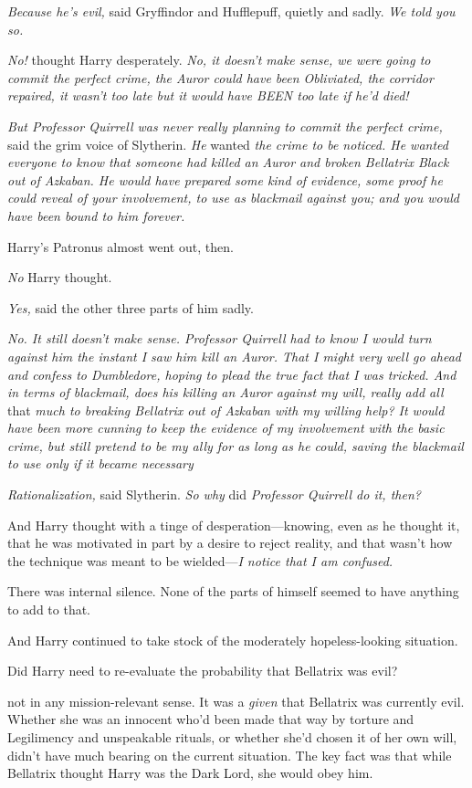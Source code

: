 \emph{Because he's evil,} said Gryffindor and Hufflepuff, quietly and sadly.
\emph{We told you so.}

\emph{No!} thought Harry desperately. \emph{No, it doesn't make sense, we were
going to commit the perfect crime, the Auror could have been Obliviated, the
corridor repaired, it wasn't too late but it would have BEEN too late if he'd
died!}

\emph{But Professor Quirrell was never really planning to commit the perfect
crime,} said the grim voice of Slytherin. \emph{He} wanted \emph{the crime to
be noticed. He wanted everyone to know that someone had killed an Auror and
broken Bellatrix Black out of Azkaban. He would have prepared some kind of
evidence, some proof he could reveal of your involvement, to use as blackmail
against you; and you would have been bound to him forever.}

Harry's Patronus almost went out, then.

\emph{No{\el}} Harry thought.

\emph{Yes,} said the other three parts of him sadly.

\emph{No. It still doesn't make sense. Professor Quirrell had to know I would
turn against him the instant I saw him kill an Auror. That I might very well go
ahead and confess to Dumbledore, hoping to plead the true fact that I was
tricked. And{\el} in terms of blackmail, does his killing an Auror against
my will, really add all} that \emph{much to breaking Bellatrix out of Azkaban
with my willing help? It would have been more cunning to keep the evidence of
my involvement with the basic crime, but still pretend to be my ally for as
long as he could, saving the blackmail to use only if it became
necessary{\el}}

\emph{Rationalization,} said Slytherin. \emph{So why} did \emph{Professor
Quirrell do it, then?}

And Harry thought with a tinge of desperation—knowing, even as he thought it,
that he was motivated in part by a desire to reject reality, and that wasn't
how the technique was meant to be wielded—\emph{I notice that I am confused.}

There was internal silence. None of the parts of himself seemed to have
anything to add to that.

And Harry continued to take stock of the moderately hopeless-looking situation.

Did Harry need to re-evaluate the probability that Bellatrix was evil?

{\el} not in any mission-relevant sense. It was a \emph{given} that Bellatrix
was currently evil. Whether she was an innocent who'd been made that way by
torture and Legilimency and unspeakable rituals, or whether she'd chosen it of
her own will, didn't have much bearing on the current situation. The key fact
was that while Bellatrix thought Harry was the Dark Lord, she would obey him.

